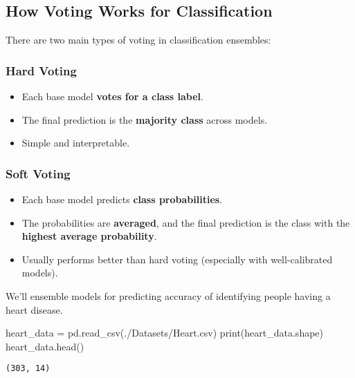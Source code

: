 \documentclass[
  letterpaper,
  DIV=11,
  numbers=noendperiod]{scrreprt}
\newenvironment{Shaded}{\begin{snugshade}}{\end{snugshade}}
\newcommand{\BuiltInTok}[1]{\textcolor[rgb]{0.00,0.23,0.31}{#1}}
\newcommand{\NormalTok}[1]{\textcolor[rgb]{0.00,0.23,0.31}{#1}}
\newcommand{\OperatorTok}[1]{\textcolor[rgb]{0.37,0.37,0.37}{#1}}
\newcommand{\StringTok}[1]{\textcolor[rgb]{0.13,0.47,0.30}{#1}}
\providecommand{\tightlist}{%
  \setlength{\itemsep}{0pt}\setlength{\parskip}{0pt}}\usepackage{longtable,booktabs,array}
\begin{document}
\subsection{How Voting Works for
Classification}\label{how-voting-works-for-classification}

There are two main types of voting in classification ensembles:

\subsubsection{Hard Voting}\label{hard-voting}

\begin{itemize}
\tightlist
\item
  Each base model \textbf{votes for a class label}.
\item
  The final prediction is the \textbf{majority class} across models.
\item
  Simple and interpretable.
\end{itemize}

\subsubsection{Soft Voting}\label{soft-voting}

\begin{itemize}
\tightlist
\item
  Each base model predicts \textbf{class probabilities}.
\item
  The probabilities are \textbf{averaged}, and the final prediction is
  the class with the \textbf{highest average probability}.
\item
  Usually performs better than hard voting (especially with
  well-calibrated models).
\end{itemize}

We'll ensemble models for predicting accuracy of identifying people
having a heart disease.

\begin{Shaded}
\begin{Highlighting}[]
\NormalTok{heart\_data }\OperatorTok{=}\NormalTok{ pd.read\_csv(}\StringTok{\textquotesingle{}./Datasets/Heart.csv\textquotesingle{}}\NormalTok{)}
\BuiltInTok{print}\NormalTok{(heart\_data.shape)}
\NormalTok{heart\_data.head()}
\end{Highlighting}
\end{Shaded}

\begin{verbatim}
(303, 14)
\end{verbatim}
\end{document}
